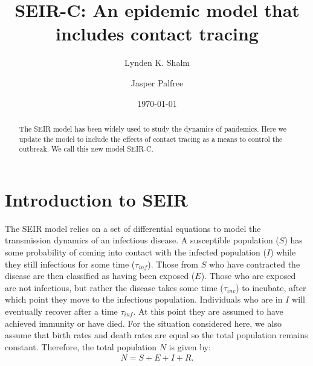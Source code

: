 \documentclass[notitlepage, superscriptaddress]{revtex4-2}
\begin{document}
\title{SEIR-C: An epidemic model that includes contact tracing}

\author{Lynden K. Shalm}
\author{Jasper Palfree}


\begin{abstract}
The SEIR model has been widely used to study the dynamics of pandemics. Here we update the model to include the effects of contact tracing as a means to control the outbreak. We call this new model SEIR-C.
\end{abstract}
\date{\today}
\maketitle

\section{Introduction to SEIR}

The SEIR model relies on a set of differential equations to model the transmission dynamics of an infectious disease. A susceptible population ($S$) has some probability of coming into contact with the infected population ($I$) while they still infectious for some time ($\tau_{inf}$). Those from $S$ who have contracted the disease are then classified as having been exposed ($E$). Those who are exposed are not infectious, but rather the disease takes some time ($\tau_{inc}$) to incubate, after which point they move to the infectious population. Individuals who are in $I$ will eventually recover after a time $\tau_{inf}$. At this point they are assumed to have achieved immunity or have died. For the situation considered here, we also assume that birth rates and death rates are equal so the total population remains constant. Therefore, the total population $N$ is given by:
\begin{eqnarray}
\label{E:SEIRPop}
N = S + E + I + R.
\end{eqnarray}
\end{document}
